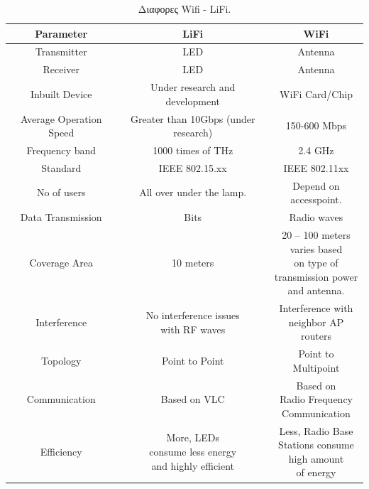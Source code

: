 \documentclass[conference]{IEEEtran}
\begin{document}
\begin{table}[H]
\footnotesize
\caption{Διαφορες Wifi - LiFi.\cite{b9}} %
\centering %

\begin{tabular}{c c c} %
\hline\hline %
Parameter & LiFi  & WiFi \\ [0.5ex] %
\hline %
Transmitter & LED  & Antenna \\  \hline%
Receiver  & LED  & Antenna \\  \hline
Inbuilt Device & Under research and  development  & WiFi Card/Chip  \\ \hline
Average Operation Speed & Greater than 10Gbps (under research)  &150-600 Mbps  \\ \hline
Frequency band & 1000 times of THz & 2.4 GHz \\   \hline
Standard & IEEE 802.15.xx & IEEE 802.11xx  \\   \hline
No of users & All over under the lamp. & \makecell{Depend on\\ accesspoint.} \\   \hline
Data Transmission& Bits&Radio waves  \\   \hline
Coverage Area & 10 meters  & \makecell{20 – 100 meters \\varies based\\ on type of\\transmission power\\ and
antenna.}  \\   \hline
Interference &\makecell{No interference issues \\ with RF  waves}&
\makecell{Interference with \\neighbor AP routers}  \\   \hline
Topology & Point to Point & Point to Multipoint  \\   \hline
Communication & Based on VLC & \makecell{Based on\\Radio Frequency\\ Communication}  \\   \hline
Efficiency &\makecell{ More, LEDs \\consume less energy\\and highly efficient}&
\makecell{Less, Radio Base\\Stations consume\\high amount\\of energy}  \\   \hline

\end{tabular}
\end{table}
\end{document}
